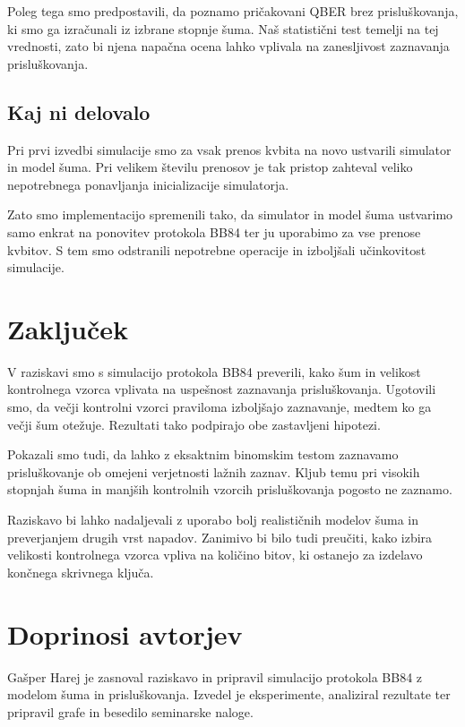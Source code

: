 Poleg tega smo predpostavili, da poznamo
pričakovani QBER brez prisluškovanja,
ki smo ga izračunali iz izbrane stopnje šuma.
Naš statistični test temelji na tej vrednosti,
zato bi njena napačna ocena lahko vplivala
na zanesljivost zaznavanja prisluškovanja.


\subsection{Kaj ni delovalo}
\label{g22:sec:neuspehi}


Pri prvi izvedbi simulacije smo za vsak
prenos kvbita na novo ustvarili simulator
in model šuma. Pri velikem številu prenosov
je tak pristop zahteval veliko nepotrebnega
ponavljanja inicializacije simulatorja.

Zato smo implementacijo spremenili tako,
da simulator in model šuma ustvarimo samo
enkrat na ponovitev protokola BB84 ter ju
uporabimo za vse prenose kvbitov.
S tem smo odstranili nepotrebne operacije
in izboljšali učinkovitost simulacije.




\section{Zaključek}
\label{g22:sec:zakljucek}

V raziskavi smo s simulacijo protokola BB84
preverili, kako šum in velikost kontrolnega
vzorca vplivata na uspešnost zaznavanja
prisluškovanja. Ugotovili smo, da večji
kontrolni vzorci praviloma izboljšajo
zaznavanje, medtem ko ga večji šum otežuje.
Rezultati tako podpirajo obe zastavljeni
hipotezi.

Pokazali smo tudi, da lahko z eksaktnim
binomskim testom zaznavamo prisluškovanje
ob omejeni verjetnosti lažnih zaznav.
Kljub temu pri visokih stopnjah šuma in
manjših kontrolnih vzorcih prisluškovanja
pogosto ne zaznamo.

Raziskavo bi lahko nadaljevali z uporabo
bolj realističnih modelov šuma in preverjanjem
drugih vrst napadov. Zanimivo bi bilo tudi
preučiti, kako izbira velikosti kontrolnega
vzorca vpliva na količino bitov, ki ostanejo
za izdelavo končnega skrivnega ključa.




\section*{Doprinosi avtorjev}

Gašper Harej je zasnoval raziskavo in pripravil
simulacijo protokola BB84 z modelom šuma in
prisluškovanja. Izvedel je eksperimente,
analiziral rezultate ter pripravil grafe
in besedilo seminarske naloge.




